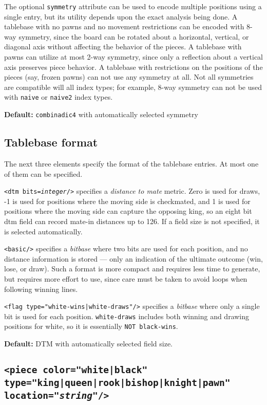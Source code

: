 \documentclass[11pt]{article}
\begin{document}
The optional {\tt symmetry} attribute can be used to encode multiple
positions using a single entry, but its utility depends upon the exact
analysis being done.  A tablebase with no pawns and no movement
restrictions can be encoded with 8-way symmetry,
since the board can be rotated about a horizontal, vertical, or
diagonal axis without affecting the behavior of the pieces.  A
tablebase with pawns can utilize at most 2-way
symmetry, since only a reflection about a vertical axis preserves
piece behavior.  A tablebase with restrictions on the positions of the
pieces (say, frozen pawns) can not use any symmetry at all.
Not all symmetries are compatible will all index types; for example,
8-way symmetry can not be used with {\tt naive} or {\tt naive2}
index types.

{\bf Default:} {\tt combinadic4} with automatically selected symmetry

\subsection{Tablebase format}

The next three elements specify the format of the tablebase entries.
At most one of them can be specified.

{\tt <dtm bits={\it integer}/>} specifies a {\it distance to mate}
metric.  Zero is used for draws, -1 is used for positions where the
moving side is checkmated, and 1 is used for positions where the
moving side can capture the opposing king, so an eight bit dtm field
can record mate-in distances up to 126.  If a field size is not
specified, it is selected automatically.

{\tt <basic/>} specifies a {\it bitbase} where two bits are used for
each position, and no distance information is stored --- only an
indication of the ultimate outcome (win, lose, or draw).  Such a format
is more compact and requires less time to generate, but requires more
effort to use, since care must be taken to avoid loops when following
winning lines.

{\tt <flag type="white-wins|white-draws"/>} specifies a {\it bitbase}
where only a single bit is used for each position.  {\tt white-draws}
includes both winning and drawing positions for white, so it is
essentially {\tt NOT black-wins}.

{\bf Default:} DTM with automatically selected field size.


\subsection{\tt <piece color="white|black" type="king|queen|rook|bishop|knight|pawn" \hfil\break\hbox{\qquad} location="{\it string}"/>}
\end{document}
